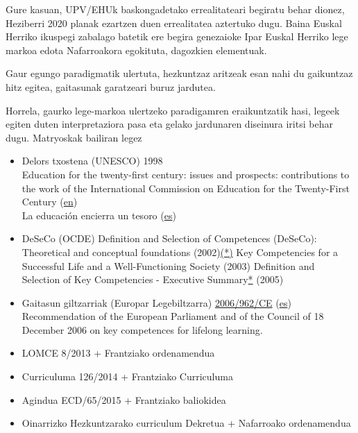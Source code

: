 \documentclass[]{book}
\providecommand{\tightlist}{%
  \setlength{\itemsep}{0pt}\setlength{\parskip}{0pt}}
\begin{document}
Gure kasuan, UPV/EHUk baskongadetako errealitateari begiratu behar dionez, Heziberri 2020 planak ezartzen duen errealitatea aztertuko dugu. Baina Euskal Herriko ikuspegi zabalago batetik ere begira genezaioke Ipar Euskal Herriko lege markoa edota Nafarroakora egokituta, dagozkien elementuak.

Gaur egungo paradigmatik ulertuta, hezkuntzaz aritzeak esan nahi du gaikuntzaz hitz egitea, gaitasunak garatzeari buruz jardutea.

Horrela, gaurko lege-markoa ulertzeko paradigamren eraikuntzatik hasi, legeek egiten duten interpretaziora pasa eta gelako jardunaren diseinura iritsi behar dugu. Matryoskak bailiran legez

\begin{itemize}
\tightlist
\item
  Delors txostena (UNESCO) 1998\\
  Education for the twenty-first century: issues and prospects: contributions to the work of the International Commission on Education for the Twenty-First Century (\href{http://unesdoc.unesco.org/images/0011/001147/114766e.pdf}{en})\\
  La educación encierra un tesoro (\href{http://www.unesco.org/education/pdf/DELORS_S.PDF}{es})
\item
  DeSeCo (OCDE)
  Definition and Selection of Competences (DeSeCo): Theoretical and conceptual foundations (2002)\href{http://deseco.ch/bfs/deseco/en/index/02.parsys.34116.downloadList.87902.DownloadFile.tmp/oecddesecostrategypaperdeelsaedcericd20029.pdf}{(*)}
  Key Competencies for a Successful Life and a Well-Functioning Society (2003)
  Definition and Selection of Key Competencies - Executive Summary\href{http://deseco.ch/bfs/deseco/en/index/02.parsys.43469.downloadList.2296.DownloadFile.tmp/2005.dskcexecutivesummary.en.pdf}{*} (2005)
\item
  Gaitasun giltzarriak (Europar Legebiltzarra)
  \href{http://eur-lex.europa.eu/legal-content/EN/TXT/?uri=CELEX:32006H0962}{2006/962/CE} (\href{http://infofpe.cea.es/fpe/norm/Rec\%2018_2006.pdf}{es})
  Recommendation of the European Parliament and of the Council of 18 December 2006 on key competences for lifelong learning.
\item
  LOMCE 8/2013 + Frantziako ordenamendua
\item
  Curriculuma 126/2014 + Frantziako Curriculuma
\item
  Agindua ECD/65/2015 + Frantziako baliokidea
\item
  Oinarrizko Hezkuntzarako curriculum Dekretua + Nafarroako ordenamendua
\end{itemize}
\end{document}
